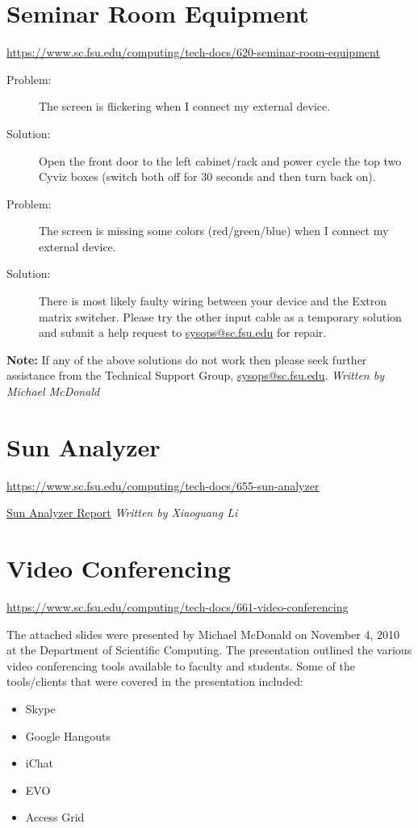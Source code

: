 \documentclass[12pt,a4paper]{article}
\begin{document}
\section{Seminar Room Equipment}
\url{https://www.sc.fsu.edu/computing/tech-docs/620-seminar-room-equipment}

\begin{description}
    \item[Problem:] The screen is flickering when I connect my external device.
    \item[Solution:] Open the front door to the left cabinet/rack and power cycle the top two Cyviz boxes (switch both off for 30 seconds and then turn back on).
    
    \item[Problem:] The screen is missing some colors (red/green/blue) when I connect my external device.
    \item[Solution:] There is most likely faulty wiring between your device and the Extron matrix switcher. Please try the other input cable as a temporary solution and submit a help request to \href{mailto:sysops@sc.fsu.edu}{sysops@sc.fsu.edu} for repair.
\end{description}
\textbf{Note:} If any of the above solutions do not work then please seek further assistance from the Technical Support Group, \href{mailto:sysops@sc.fsu.edu}{sysops@sc.fsu.edu}.
\hfill \textit{Written by Michael McDonald}

\section{Sun Analyzer}
\url{https://www.sc.fsu.edu/computing/tech-docs/655-sun-analyzer}

\href{https://www.sc.fsu.edu/computing/tech-docs/attachments/655-sun-analyzer/analyzer.pdf}{Sun Analyzer Report}
\hfill \textit{Written by Xiaoguang Li}

\section{Video Conferencing}
\url{https://www.sc.fsu.edu/computing/tech-docs/661-video-conferencing}

The attached slides were presented by Michael McDonald on November 4, 2010 at the Department of Scientific Computing. The presentation outlined the various video conferencing tools available to faculty and students. Some of the tools/clients that were covered in the presentation included:
\begin{itemize}
    \item Skype
    \item Google Hangouts
    \item iChat
    \item EVO
    \item Access Grid
\end{itemize}
\end{document}
